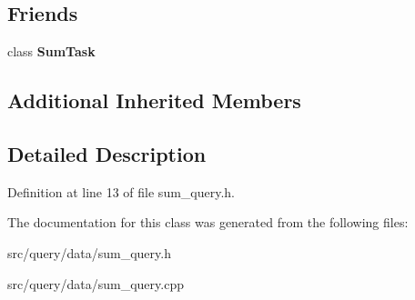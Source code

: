 \subsection*{Friends}
\begin{DoxyCompactItemize}
\item 
\mbox{\label{class_sum_query_a2bbe94890b2996fa2c9c59ecbb6021fb}} 
class {\bfseries Sum\+Task}
\end{DoxyCompactItemize}
\subsection*{Additional Inherited Members}


\subsection{Detailed Description}


Definition at line 13 of file sum\+\_\+query.\+h.



The documentation for this class was generated from the following files\+:\begin{DoxyCompactItemize}
\item 
src/query/data/sum\+\_\+query.\+h\item 
src/query/data/sum\+\_\+query.\+cpp\end{DoxyCompactItemize}
